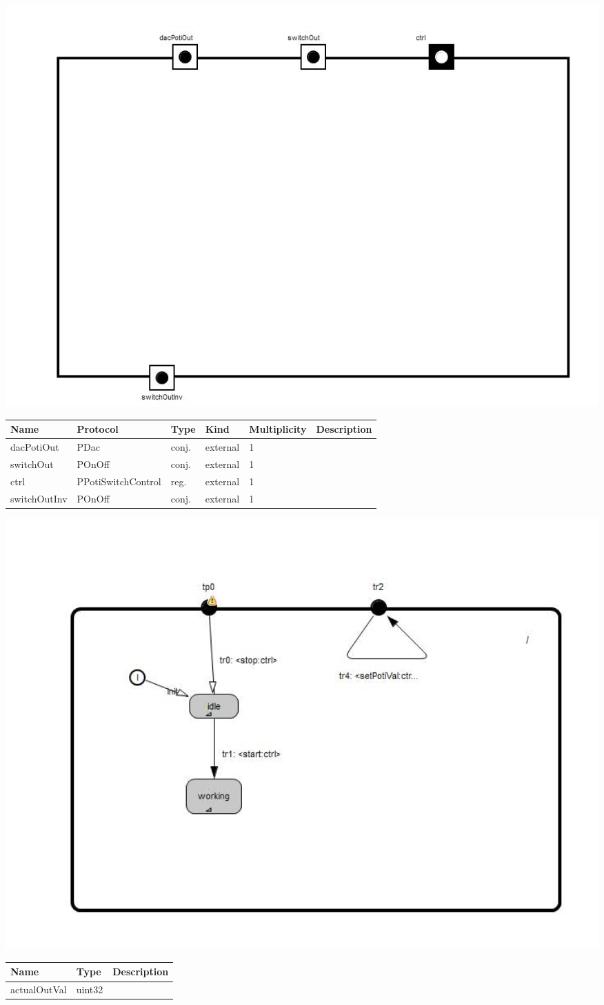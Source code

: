 
{
\centering{}
\includegraphics[width=1.0\textwidth]{./images/APotiSwitch_structure.jpg}
}

\begin{tabular}[ht]{|l|l|l|l|l|p{5cm}|}
\hline
\textbf{Name} & \textbf{Protocol} & \textbf{Type} & \textbf{Kind} & \textbf{Multiplicity} & \textbf{Description}\\
\hline
dacPotiOut & PDac & conj. & external & 1 & \\
\hline
switchOut & POnOff & conj. & external & 1 & \\
\hline
ctrl & PPotiSwitchControl & reg. & external & 1 & \\
\hline
switchOutInv & POnOff & conj. & external & 1 & \\
\hline
\end{tabular}

{
\centering{}
\includegraphics[width=1.0\textwidth]{./images/APotiSwitch_behavior.jpg}
}

\begin{par}

\end{par}


\begin{tabular}[ht]{|l|l|p{8cm}|}
\hline
\textbf{Name} & \textbf{Type} & \textbf{Description}\\
\hline
actualOutVal & uint32 & \\
\hline
\end{tabular}

